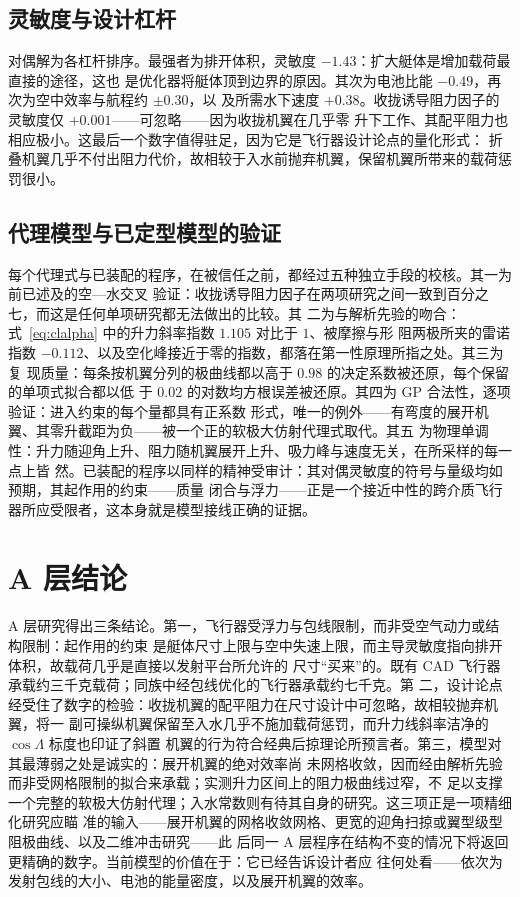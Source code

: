 \documentclass[a4paper,10pt,twocolumn]{ctexart}
\begin{document}
\subsection{灵敏度与设计杠杆}
对偶解为各杠杆排序。最强者为排开体积，灵敏度 $-1.43$：扩大艇体是增加载荷最直接的途径，这也
是优化器将艇体顶到边界的原因。其次为电池比能 $-0.49$，再次为空中效率与航程约 $\pm0.30$，以
及所需水下速度 $+0.38$。收拢诱导阻力因子的灵敏度仅 $+0.001$——可忽略——因为收拢机翼在几乎零
升下工作、其配平阻力也相应极小。这最后一个数字值得驻足，因为它是飞行器设计论点的量化形式：
折叠机翼几乎不付出阻力代价，故相较于入水前抛弃机翼，保留机翼所带来的载荷惩罚很小。

\subsection{代理模型与已定型模型的验证}
每个代理式与已装配的程序，在被信任之前，都经过五种独立手段的校核。其一为前已述及的空—水交叉
验证：收拢诱导阻力因子在两项研究之间一致到百分之七，而这是任何单项研究都无法做出的比较。其
二为与解析先验的吻合：式~\eqref{eq:clalpha} 中的升力斜率指数 $1.105$ 对比于 $1$、被摩擦与形
阻两极所夹的雷诺指数 $-0.112$、以及空化峰接近于零的指数，都落在第一性原理所指之处。其三为复
现质量：每条按机翼分列的极曲线都以高于 $0.98$ 的决定系数被还原，每个保留的单项式拟合都以低
于 $0.02$ 的对数均方根误差被还原。其四为 GP 合法性，逐项验证：进入约束的每个量都具有正系数
形式，唯一的例外——有弯度的展开机翼、其零升截距为负——被一个正的软极大仿射代理式取代。其五
为物理单调性：升力随迎角上升、阻力随机翼展开上升、吸力峰与速度无关，在所采样的每一点上皆
然。已装配的程序以同样的精神受审计：其对偶灵敏度的符号与量级均如预期，其起作用的约束——质量
闭合与浮力——正是一个接近中性的跨介质飞行器所应受限者，这本身就是模型接线正确的证据。

\section{A 层结论}

A 层研究得出三条结论。第一，飞行器受浮力与包线限制，而非受空气动力或结构限制：起作用的约束
是艇体尺寸上限与空中失速上限，而主导灵敏度指向排开体积，故载荷几乎是直接以发射平台所允许的
尺寸“买来”的。既有 CAD 飞行器承载约三千克载荷；同族中经包线优化的飞行器承载约七千克。第
二，设计论点经受住了数字的检验：收拢机翼的配平阻力在尺寸设计中可忽略，故相较抛弃机翼，将一
副可操纵机翼保留至入水几乎不施加载荷惩罚，而升力线斜率洁净的 $\cos\Lambda$ 标度也印证了斜置
机翼的行为符合经典后掠理论所预言者。第三，模型对其最薄弱之处是诚实的：展开机翼的绝对效率尚
未网格收敛，因而经由解析先验而非受网格限制的拟合来承载；实测升力区间上的阻力极曲线过窄，不
足以支撑一个完整的软极大仿射代理；入水常数则有待其自身的研究。这三项正是一项精细化研究应瞄
准的输入——展开机翼的网格收敛网格、更宽的迎角扫掠或翼型级型阻极曲线、以及二维冲击研究——此
后同一 A 层程序在结构不变的情况下将返回更精确的数字。当前模型的价值在于：它已经告诉设计者应
往何处看——依次为发射包线的大小、电池的能量密度，以及展开机翼的效率。


\end{document}
